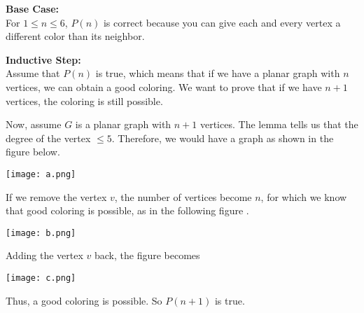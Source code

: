 \documentclass[11pt]{article}
\newcommand{\cmark}{\ding{51}}%
\begin{document}
\begin{enumerate}
\begin{enumerate}
			\textbf{Base Case:} \\
			For $1 \le n \le 6$, $P(n)$ is correct because you can give each and every vertex a different color than its neighbor. 
			
			\textbf{Inductive Step:} \\
			Assume that $P(n)$ is true, which means that if we have a planar graph with $n$ vertices, we can obtain a good coloring. We want to prove that if we have $n+1$ vertices, the coloring is still possible. 
			
			Now, assume $G$ is a planar graph with $n + 1$ vertices. The lemma tells us that the degree of the vertex $ \le 5$. Therefore, we would have a graph as shown in the figure below.
			
			\texttt{[image: a.png]}
			
			If we remove the vertex $v$, the number of vertices become $n$, for which we know that good coloring is possible, as in the following figure . 

			\texttt{[image: b.png]}

			Adding the vertex $v$ back, the figure becomes

			\texttt{[image: c.png]}
			
		Thus, a good coloring is possible. So $P(n+1)$ is true. \cmark
			
		\end{enumerate}
		
	\end{enumerate}
\end{document}
